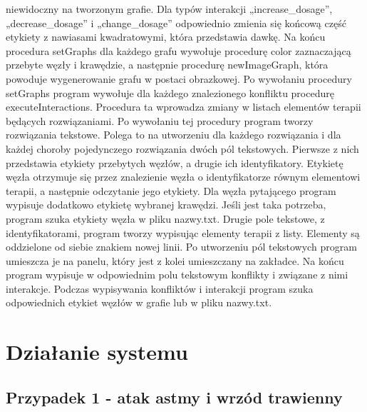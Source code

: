 \documentclass[oneside,a4paper]{book}
\begin{document}
\begin{spacing}{1.5}
niewidoczny na tworzonym grafie. Dla typów interakcji „increase\_dosage”, „decrease\_dosage” i „change\_dosage” odpowiednio zmienia się końcową część etykiety z nawiasami kwadratowymi, która przedstawia dawkę. Na końcu procedura setGraphs dla każdego grafu wywołuje procedurę color zaznaczającą przebyte węzły i krawędzie, a następnie procedurę newImageGraph, która powoduje wygenerowanie grafu w postaci obrazkowej. 
Po wywołaniu procedury setGraphs program wywołuje dla każdego znalezionego konfliktu procedurę executeInteractions. Procedura ta wprowadza zmiany w listach elementów terapii będących rozwiązaniami. Po wywołaniu tej procedury program tworzy rozwiązania tekstowe. Polega to na utworzeniu dla każdego rozwiązania i dla każdej choroby pojedynczego rozwiązania dwóch pól tekstowych. Pierwsze z nich przedstawia etykiety przebytych węzłów, a drugie ich identyfikatory. Etykietę węzła otrzymuje się przez znalezienie węzła o identyfikatorze równym elementowi terapii, a następnie odczytanie jego etykiety. Dla węzła pytającego program wypisuje dodatkowo etykietę wybranej krawędzi. Jeśli jest taka potrzeba, program szuka etykiety węzła w pliku nazwy.txt. Drugie pole tekstowe, z identyfikatorami, program tworzy wypisując elementy terapii z listy. Elementy są oddzielone od siebie znakiem nowej linii. Po utworzeniu pól tekstowych program umieszcza je na panelu, który jest z kolei umieszczany na zakładce. Na końcu program wypisuje w odpowiednim polu tekstowym konflikty i związane z nimi interakcje. Podczas wypisywania konfliktów i interakcji program szuka odpowiednich etykiet węzłów w grafie lub w pliku nazwy.txt. 

\chapter{Działanie systemu}

\section{Przypadek 1 - atak astmy i wrzód trawienny}


\end{spacing}
\end{document}
